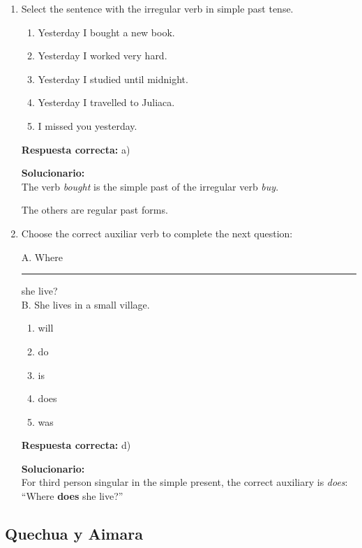 \begin{enumerate}

	
	\item Select the sentence with the irregular verb in simple past tense.
	\begin{enumerate}[label=\alph*)]
		\item Yesterday I bought a new book.
		\item Yesterday I worked very hard.
		\item Yesterday I studied until midnight.
		\item Yesterday I travelled to Juliaca.
		\item I missed you yesterday.
	\end{enumerate}
	\textbf{Respuesta correcta:} a)
	
	\vspace{2mm}
	\textbf{Solucionario:}\\
	The verb \textit{bought} is the simple past of the irregular verb \textit{buy}.
	
	The others are regular past forms.
	

	
	\vspace{6mm}
	
	\item Choose the correct auxiliar verb to complete the next question:
	
	A. Where \rule{1.5cm}{0.15mm} she live?\\
	B. She lives in a small village.
	\begin{enumerate}[label=\alph*)]
		\item will
		\item do
		\item is
		\item does
		\item was
	\end{enumerate}
	\textbf{Respuesta correcta:} d)
	
	\vspace{2mm}
	\textbf{Solucionario:}\\
	For third person singular in the simple present, the correct auxiliary is \textit{does}: ``Where \textbf{does} she live?''
	

	
	\vspace{6mm}
\end{enumerate}

\subsection*{Quechua y Aimara}

